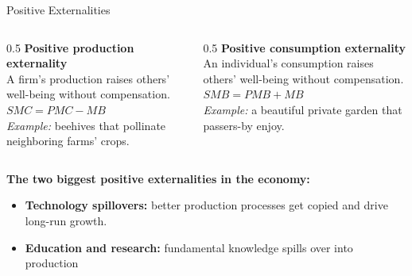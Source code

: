 \documentclass[11pt,aspectratio=169]{beamer}
\begin{document}
\begin{frame}{Positive Externalities}
  \begin{columns}[T]
    \begin{column}{0.5\textwidth}
      \textbf{Positive production externality}\\
      \small A firm's production raises others' well-being without compensation.\\
      $SMC = PMC - MB$\\[0.4em]
      \emph{Example:} beehives that pollinate neighboring farms' crops.
    \end{column}
    \begin{column}{0.5\textwidth}
      \textbf{Positive consumption externality}\\
      \small An individual's consumption raises others' well-being without compensation.\\
      $SMB = PMB + MB$\\[0.4em]
      \emph{Example:} a beautiful private garden that passers-by enjoy.
    \end{column}
  \end{columns}
  \vspace{0.8em}
  \textbf{The two biggest positive externalities in the economy:}
  \begin{itemize}
    \item \textbf{Technology spillovers:} better production processes get copied and drive long-run growth.
    \item \textbf{Education and research:} fundamental knowledge spills over into production
  \end{itemize}
\end{frame}
\end{document}
